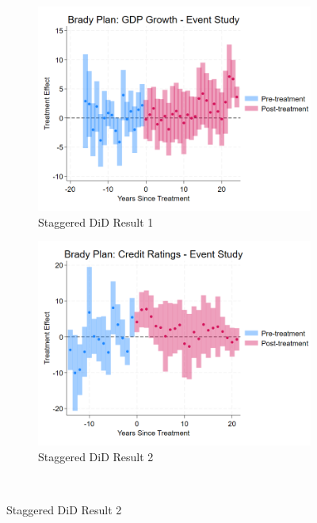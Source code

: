 \begin{figure}[ht!]
    \centering
    \begin{subfigure}[b]{0.48\textwidth}
        \centering
        \includegraphics[width=\textwidth]{figures/CS_Brady_Growth_EventStudy.png}
        \caption{Staggered DiD Result 1}
        \label{fig:stag1}
    \end{subfigure}
    \hfill
    \begin{subfigure}[b]{0.48\textwidth}
        \centering
        \includegraphics[width=\textwidth]{figures/CS_Brady_Ratings_EventStudy.png}
        \caption{Staggered DiD Result 2}
        \label{fig:stag2}
    \end{subfigure}
    \\[1em]

\end{figure}
